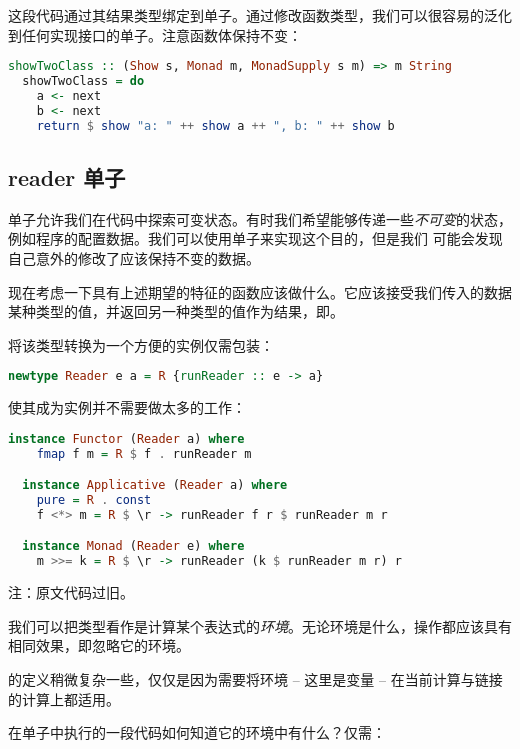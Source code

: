 \documentclass[./main.tex]{subfiles}
\begin{document}
这段代码通过其结果类型绑定到单子。通过修改函数类型，我们可以很容易的泛化到任何实现接口的单子。注意函数体保持不变：

\begin{lstlisting}[language=Haskell]
  showTwoClass :: (Show s, Monad m, MonadSupply s m) => m String
  showTwoClass = do
    a <- next
    b <- next
    return $ show "a: " ++ show a ++ ", b: " ++ show b
\end{lstlisting}

\subsection*{reader 单子}

单子允许我们在代码中探索可变状态。有时我们希望能够传递一些\textit{不可变}的状态，例如程序的配置数据。我们可以使用单子来实现这个目的，但是我们
可能会发现自己意外的修改了应该保持不变的数据。

现在考虑一下具有上述期望的特征的函数应该做什么。它应该接受我们传入的数据某种类型的值，并返回另一种类型的值作为结果，即。

将该类型转换为一个方便的实例仅需包装：

\begin{lstlisting}[language=Haskell]
  newtype Reader e a = R {runReader :: e -> a}
\end{lstlisting}

使其成为实例并不需要做太多的工作：

\begin{lstlisting}[language=Haskell]
  instance Functor (Reader a) where
    fmap f m = R $ f . runReader m

  instance Applicative (Reader a) where
    pure = R . const
    f <*> m = R $ \r -> runReader f r $ runReader m r

  instance Monad (Reader e) where
    m >>= k = R $ \r -> runReader (k $ runReader m r) r
\end{lstlisting}

注：原文代码过旧。

我们可以把类型看作是计算某个表达式的\textit{环境}。无论环境是什么，操作都应该具有相同效果，即忽略它的环境。

\acode{(>>=)}的定义稍微复杂一些，仅仅是因为需要将环境 -- 这里是变量 -- 在当前计算与链接的计算上都适用。

在单子中执行的一段代码如何知道它的环境中有什么？仅需：
\end{document}
